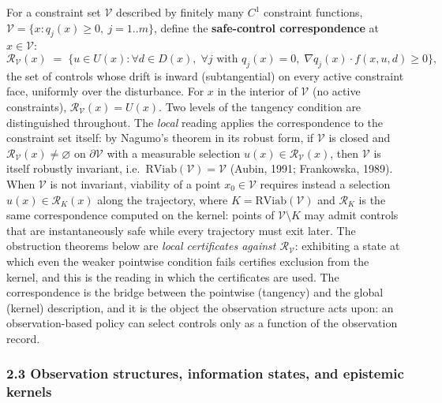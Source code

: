 \documentclass[11pt]{article}
\begin{document}
For a constraint set \(\mathcal{V}\) described by finitely many \(C^1\)
constraint functions,
\(\mathcal{V} = \{ x : q_j(x) \ge 0,\ j = 1..m \}\), define the
\textbf{safe-control correspondence} at \(x \in \mathcal{V}\):
\[\mathcal{R}_{\mathcal{V}}(x) \;=\; \Big\{ u \in U(x) : \forall d \in D(x),\; \forall j \text{ with } q_j(x) = 0,\; \nabla q_j(x) \cdot f(x, u, d) \ge 0 \Big\},\]
the set of controls whose drift is inward (subtangential) on every
active constraint face, uniformly over the disturbance. For \(x\) in the
interior of \(\mathcal{V}\) (no active constraints),
\(\mathcal{R}_{\mathcal{V}}(x) = U(x)\). Two levels of the tangency
condition are distinguished throughout. The \emph{local} reading applies
the correspondence to the constraint set itself: by Nagumo's theorem in
its robust form, if \(\mathcal{V}\) is closed and
\(\mathcal{R}_{\mathcal{V}}(x) \neq \varnothing\) on
\(\partial\mathcal{V}\) with a measurable selection
\(u(x) \in \mathcal{R}_{\mathcal{V}}(x)\), then \(\mathcal{V}\) is
itself robustly invariant,
i.e.~\(\mathrm{RViab}(\mathcal{V}) = \mathcal{V}\) (Aubin, 1991;
Frankowska, 1989). When \(\mathcal{V}\) is not invariant, viability of a
point \(x_0 \in \mathcal{V}\) requires instead a selection
\(u(x) \in \mathcal{R}_K(x)\) along the trajectory, where
\(K = \mathrm{RViab}(\mathcal{V})\) and \(\mathcal{R}_K\) is the same
correspondence computed on the kernel: points of
\(\mathcal{V} \setminus K\) may admit controls that are instantaneously
safe while every trajectory must exit later. The obstruction
theorems below are \emph{local certificates against
\(\mathcal{R}_{\mathcal{V}}\)}: exhibiting a state at which even the
weaker pointwise condition fails certifies exclusion from the kernel,
and this is the reading in which the certificates are used. The
correspondence is the bridge between the pointwise (tangency) and the
global (kernel) description, and it is the object the observation
structure acts upon: an observation-based policy can select controls
only as a function of the observation record.

\subsubsection{2.3 Observation structures, information states, and
epistemic
kernels}\label{observation-structures-information-states-and-epistemic-kernels}
\end{document}
